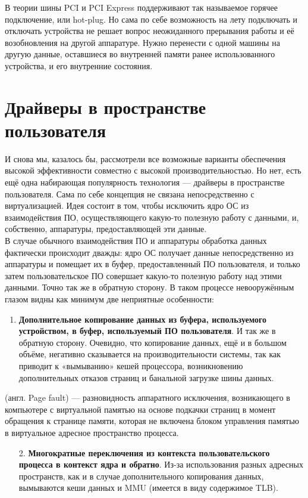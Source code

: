 \documentclass[14pt, a4paper]{article}
\begin{document}
В теории шины PCI и PCI Express поддерживают так называемое горячее подключение, или hot-plug.
Но сама по себе возможность на лету подключать и отключать устройства не решает вопрос
неожиданного прерывания работы и её возобновления на другой аппаратуре. Нужно перенести с
одной машины на другую данные, оставшиеся во внутренней памяти ранее использованного
устройства, и его внутренние состояния.

\section*{Драйверы в пространстве пользователя} 

И снова мы, казалось бы, рассмотрели все возможные варианты обеспечения высокой
эффективности совместно с высокой производительностью. Но нет, есть ещё одна набирающая
популярность технология — драйверы в пространстве пользователя. Сама по себе концепция не
связана непосредственно с виртуализацией. Идея состоит в том, чтобы исключить ядро ОС из
взаимодействия ПО, осуществляющего какую-то полезную работу с данными, и, собственно,
аппаратуры, предоставляющей эти данные.\\

В случае обычного взаимодействия ПО и аппаратуры обработка данных фактически происходит
дважды: ядро ОС получает данные непосредственно из аппаратуры и помещает их в буфер,
предоставленный ПО пользователя, и только затем пользовательское ПО совершает какую-то
полезную работу над этими данными. Точно так же в обратную сторону. В таком процессе
невооружённым глазом видны как минимум две неприятные особенности:

\begin{enumerate}
    \item \textbf{Дополнительное копирование данных из буфера, используемого устройством, в буфер,
    используемый ПО пользователя}. И так же в обратную сторону. Очевидно, что копирование
    данных, ещё и в большом объёме, негативно сказывается на производительности системы,
    так как приводит к «вымыванию» кешей процессора, возникновению дополнительных отказов
    страниц и банальной загрузке шины данных.
\end{enumerate}
\noindent \href{https://ru.wikipedia.org/wiki/Отказ_страницы}{} (англ. Page fault) — разновидность аппаратного исключения, возникающего в
компьютере с виртуальной памятью на основе подкачки страниц в момент обращения к странице 
памяти, которая не включена блоком управления памятью в виртуальное адресное пространство
процесса.
\begin{enumerate}
\item[2.] \textbf{Многократные переключения из контекста пользовательского процесса в контекст ядра
и обратно}. Из-за использования разных адресных пространств, как и в случае
дополнительного копирования данных, вымываются кеши данных и MMU (имеется в виду
содержимое TLB).
\end{enumerate}
\end{document}
